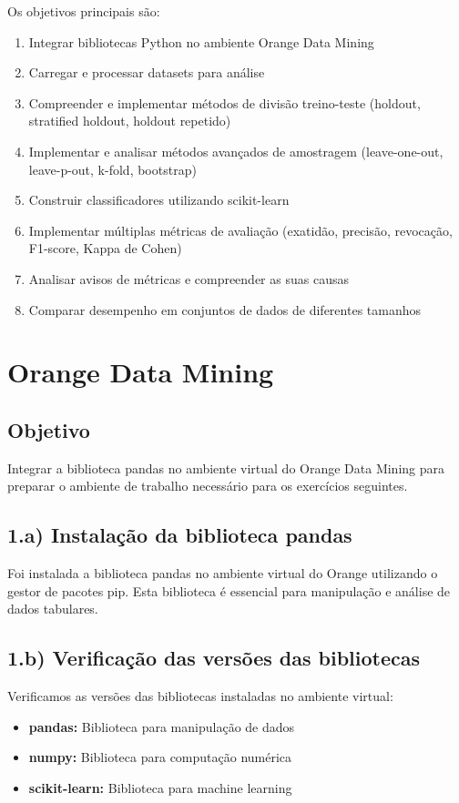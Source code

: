 \documentclass[12pt,a4paper]{article}
\begin{document}
Os objetivos principais são:
\begin{enumerate}
    \item Integrar bibliotecas Python no ambiente Orange Data Mining
    \item Carregar e processar datasets para análise
    \item Compreender e implementar métodos de divisão treino-teste (holdout, stratified holdout, holdout repetido)
    \item Implementar e analisar métodos avançados de amostragem (leave-one-out, leave-p-out, k-fold, bootstrap)
    \item Construir classificadores utilizando scikit-learn
    \item Implementar múltiplas métricas de avaliação (exatidão, precisão, revocação, F1-score, Kappa de Cohen)
    \item Analisar avisos de métricas e compreender as suas causas
    \item Comparar desempenho em conjuntos de dados de diferentes tamanhos
\end{enumerate}

\section{Orange Data Mining}

\subsection{Objetivo}

Integrar a biblioteca pandas no ambiente virtual do Orange Data Mining para preparar o ambiente de trabalho necessário para os exercícios seguintes.

\subsection{1.a) Instalação da biblioteca pandas}

Foi instalada a biblioteca pandas no ambiente virtual do Orange utilizando o gestor de pacotes pip. Esta biblioteca é essencial para manipulação e análise de dados tabulares.

\subsection{1.b) Verificação das versões das bibliotecas}

Verificamos as versões das bibliotecas instaladas no ambiente virtual:
\begin{itemize}
    \item \textbf{pandas:} Biblioteca para manipulação de dados
    \item \textbf{numpy:} Biblioteca para computação numérica
    \item \textbf{scikit-learn:} Biblioteca para machine learning
\end{itemize}
\end{document}

